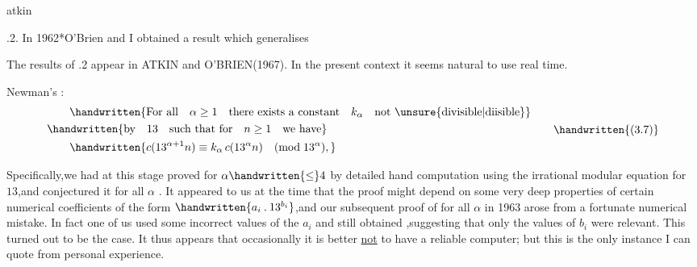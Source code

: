 \noindent\hfill atkin  

\noindent{}.2. In 1962*O'Brien and I obtained a result which generalises

\noindent\handwritten{\rule{\linewidth}{0.4pt}}

\noindent *The results of \handwritten{\S}.2 appear in ATKIN and O'BRIEN(1967). In the present context it seems natural to use real time.

\noindent\handwritten{\rule{\linewidth}{0.4pt}}

\noindent Newman's :
\[
\begin{aligned}
&\qquad\handwritten{\text{For all}\quad\alpha\geq1\quad\text{there exists a constant}\quad k_{\alpha}\quad\text{not \unsure{divisible|diisible}}}\\
&\handwritten{\text{by}\quad13\quad\text{such that for}\quad n\geq1\quad\text{we have}}\\
&\qquad\handwritten{c(13^{\alpha+1}n)\equiv k_{\alpha}\,c(13^{\alpha}n)\quad(\mathrm{mod}\;13^{\alpha}),}
\end{aligned}
\tag*{\handwritten{(3.7)}}
\]

\noindent Specifically,we had at this stage proved  for $\alpha\handwritten{\leq}4$ by detailed hand computation using the irrational modular equation for $13$,and conjectured it for all $\alpha$ . It appeared to us at the time that the proof might depend on some very deep properties of certain numerical coefficients of the form $\handwritten{a_{i}\mathbin{.}13^{b_{i}}}$,and our subsequent proof of  for all $\alpha$ in 1963 arose from a fortunate numerical mistake. In fact one of us used \unsure{\textasciigrave|\textquotesingle}some incorrect values of the \uline{$a_{i}$} and still obtained ,suggesting that only the values of \uline{$b_{i}$} were relevant. This turned out to be the case. It thus appears that occasionally it is better \uline{not} to have a reliable computer; but this is the only instance I can quote from personal experience.

